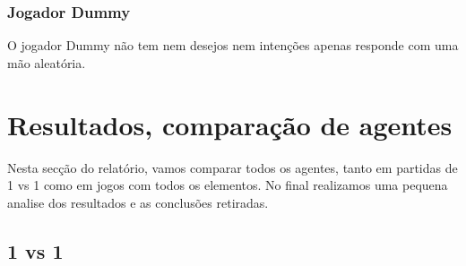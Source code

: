 \documentclass[12pt]{article}
\begin{document}
	
	\subsubsection*{Jogador Dummy}
	O jogador Dummy não tem nem desejos nem intenções apenas responde com uma mão aleatória.\\
	
	
	\section*{Resultados, comparação de agentes}
    Nesta secção do relatório, vamos comparar todos os agentes, tanto em partidas de 1 vs 1 como em jogos com todos os elementos. No final realizamos uma pequena analise dos resultados e as conclusões retiradas.
	
	\subsection*{1 vs 1}
	
\end{document}
